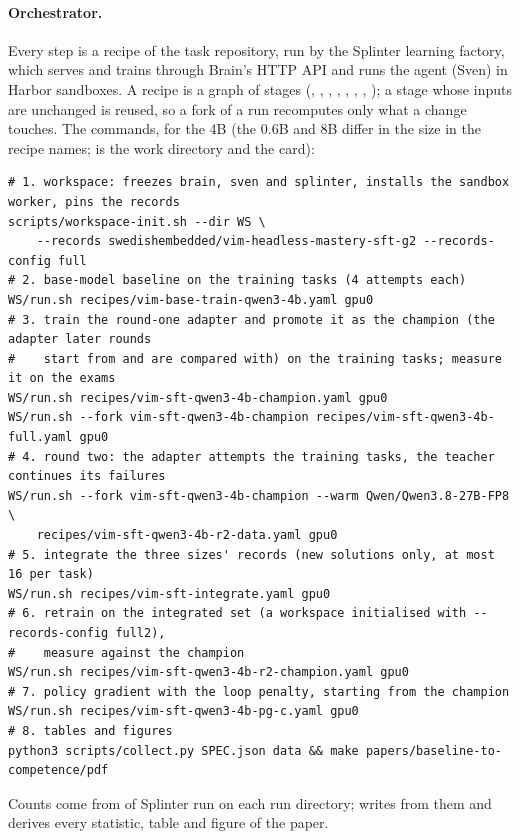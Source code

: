 \paragraph{Orchestrator.} Every step is a recipe of the task repository, run by the Splinter learning factory, which serves
and trains through Brain's HTTP API and runs the agent (Sven) in Harbor sandboxes. A recipe is a graph of stages (,
, , , , ,
, ); a stage whose inputs are unchanged is reused, so a fork of a run recomputes only what a
change touches. The commands, for the 4B (the 0.6B and 8B differ in the size in the recipe names;  is the work
directory and  the card):
{\small
\begin{verbatim}
# 1. workspace: freezes brain, sven and splinter, installs the sandbox worker, pins the records
scripts/workspace-init.sh --dir WS \
    --records swedishembedded/vim-headless-mastery-sft-g2 --records-config full
# 2. base-model baseline on the training tasks (4 attempts each)
WS/run.sh recipes/vim-base-train-qwen3-4b.yaml gpu0
# 3. train the round-one adapter and promote it as the champion (the adapter later rounds
#    start from and are compared with) on the training tasks; measure it on the exams
WS/run.sh recipes/vim-sft-qwen3-4b-champion.yaml gpu0
WS/run.sh --fork vim-sft-qwen3-4b-champion recipes/vim-sft-qwen3-4b-full.yaml gpu0
# 4. round two: the adapter attempts the training tasks, the teacher continues its failures
WS/run.sh --fork vim-sft-qwen3-4b-champion --warm Qwen/Qwen3.8-27B-FP8 \
    recipes/vim-sft-qwen3-4b-r2-data.yaml gpu0
# 5. integrate the three sizes' records (new solutions only, at most 16 per task)
WS/run.sh recipes/vim-sft-integrate.yaml gpu0
# 6. retrain on the integrated set (a workspace initialised with --records-config full2),
#    measure against the champion
WS/run.sh recipes/vim-sft-qwen3-4b-r2-champion.yaml gpu0
# 7. policy gradient with the loop penalty, starting from the champion
WS/run.sh recipes/vim-sft-qwen3-4b-pg-c.yaml gpu0
# 8. tables and figures
python3 scripts/collect.py SPEC.json data && make papers/baseline-to-competence/pdf
\end{verbatim}}
\noindent Counts come from \code{scripts/run-metrics.py} of Splinter run on each run directory; 
writes  from them and  derives every statistic, table and figure of the paper.
